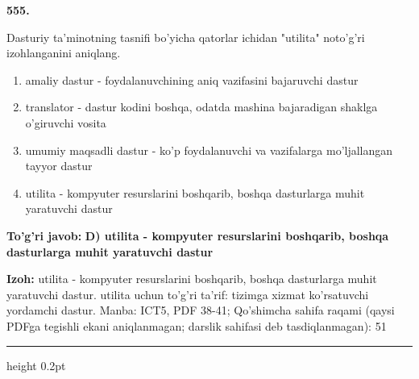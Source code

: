 \documentclass[10pt,a4paper]{article}
\begin{document}
{\bfseries\sffamily\color{ink} 555.}
\par
Dasturiy ta'minotning tasnifi bo'yicha qatorlar ichidan "utilita" noto'g'ri izohlanganini aniqlang.
\begin{enumerate}[label=\Alph*),leftmargin=9mm]
\item amaliy dastur - foydalanuvchining aniq vazifasini bajaruvchi dastur
\item translator - dastur kodini boshqa, odatda mashina bajaradigan shaklga o'giruvchi vosita
\item umumiy maqsadli dastur - ko'p foydalanuvchi va vazifalarga mo'ljallangan tayyor dastur
\item utilita - kompyuter resurslarini boshqarib, boshqa dasturlarga muhit yaratuvchi dastur
\end{enumerate}
\begin{tcolorbox}[enhanced,breakable,colback=teal!4,colframe=teal!60!black,boxrule=0.45pt,arc=1.2mm,left=2.7mm,right=2.7mm,top=1.8mm,bottom=1.8mm,before skip=2mm,after skip=2mm]
{\bfseries\sffamily\color{teal}To'g'ri javob:} \textbf{D) utilita - kompyuter resurslarini boshqarib, boshqa dasturlarga muhit yaratuvchi dastur}
\par\smallskip
{\bfseries Izoh:} utilita - kompyuter resurslarini boshqarib, boshqa dasturlarga muhit yaratuvchi dastur. utilita uchun to'g'ri ta'rif: tizimga xizmat ko'rsatuvchi yordamchi dastur. Manba: ICT5, PDF 38-41; Qo'shimcha sahifa raqami (qaysi PDFga tegishli ekani aniqlanmagan; darslik sahifasi deb tasdiqlanmagan): 51
\end{tcolorbox}
\vspace{2mm}\hrule height 0.2pt\vspace{3mm}
\end{document}

